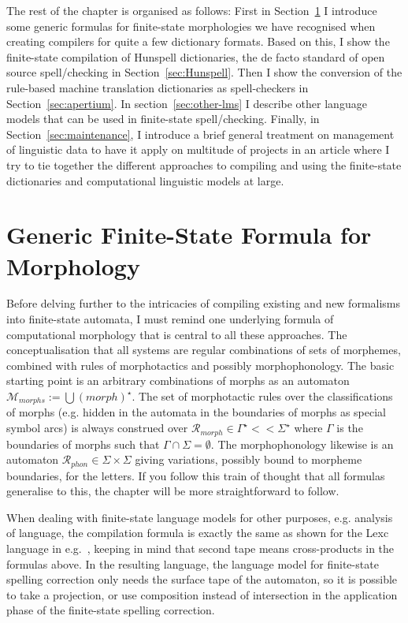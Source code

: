 \documentclass[officiallayout]{unihelcompling}
\begin{document}
The rest of the chapter is organised as follows: First in
Section~\ref{sec:generic} I introduce some generic formulas for finite-state
morphologies we have recognised when creating compilers for quite a few
dictionary formats. Based on this, I show the finite-state compilation of
Hunspell dictionaries, the de facto standard of open source spell\-/checking in
Section~\ref{sec:Hunspell}.  Then I show the conversion of the rule-based
machine translation dictionaries as spell-checkers in
Section~\ref{sec:apertium}. In section~\ref{sec:other-lms} I describe other
language models that can be used in finite-state spell\-/checking. Finally, in
Section~\ref{sec:maintenance}, I introduce a brief general treatment on
management of linguistic data to have it apply on multitude of projects in an
article where I try to tie together the different approaches to compiling and
using the finite-state dictionaries and computational linguistic models at
large.

\section{Generic Finite-State Formula for Morphology}
\label{sec:generic}

Before delving further to the intricacies of compiling existing and new
formalisms into finite-state automata, I must remind one underlying formula of
computational morphology that is central to all these approaches. The
conceptualisation that all systems are regular combinations of sets of
morphemes, combined with rules of morphotactics and possibly morphophonology.
The basic starting point is an arbitrary combinations of morphs as an automaton
$\mathcal{M}_{morphs} := \bigcup ({morph})^\star$. The set of morphotactic
rules over the classifications of morphs (e.g. hidden in the automata in the
boundaries of morphs as special symbol arcs) is always construed over
$\mathcal{R}_{morph} \in \Gamma^\star << \Sigma^\star$ where $\Gamma$ is the
boundaries of morphs such that $\Gamma \cap \Sigma = \emptyset$. The
morphophonology likewise is an automaton $\mathcal{R}_{phon} \in \Sigma \times
\Sigma$ giving variations, possibly bound to morpheme boundaries, for the
letters. If you follow this train of thought that all formulas generalise to
this, the chapter will be more straightforward to follow.

When dealing with finite-state language models for other purposes, e.g.
analysis of language, the compilation formula is exactly the same as shown for
the Lexc language in e.g.~\citet{linden2009hfst}, keeping in mind that second
tape means cross-products in the formulas above. In the resulting language, the
language model for finite-state spelling correction only needs the surface tape
of the automaton, so it is possible to take a projection, or use composition
instead of intersection in the application phase of the finite-state
spelling correction.
\end{document}
